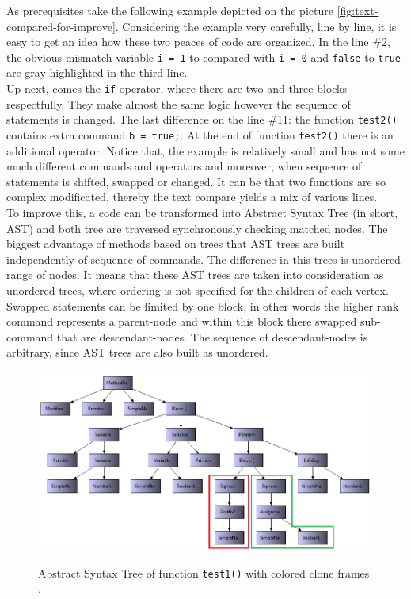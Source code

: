\documentclass{report}
\begin{document}
As prerequisites take the following example depicted on the picture \ref{fig:text-compared-for-improve}. Considering the example very carefully, line by line, it is easy to get an idea how these two peaces of code are organized. In the line \#2, the obvious mismatch variable \texttt{i = 1} to compared with \texttt{i = 0} and \texttt{false} to \texttt{true} are gray highlighted in the third line.
\\
Up next, comes the \texttt{if} operator, where there are two and three blocks respectfully. They make almost the same logic however the sequence of statements is changed.
The last difference on the line \#11: the function \texttt{test2()} contains extra command \texttt{b = true;}.
At the end of function \texttt{test2()} there is an additional operator. Notice that, the example is relatively small and has not some much different commands and operators and moreover, when sequence of statements is shifted, swapped or changed. It can be that two functions are so complex modificated, thereby the text compare yields a mix of various lines. 
\\
To improve this, a code can be transformed into Abstract Syntax Tree (in short, AST) and both tree are traversed synchronously checking matched nodes. The biggest advantage of methods based on trees that AST trees are built independently of sequence of commands. The difference in this trees is unordered range of nodes. It means that these AST trees are taken into consideration as unordered trees, where ordering is not specified for the children of each vertex. Swapped statements can be limited by one block, in other words the higher rank command represents a parent-node and within this block there swapped sub-command that are 
descendant-nodes. The sequence of descendant-nodes is arbitrary, since AST trees are also built as unordered.\\
\begin{figure}[h]
  \centering
  \includegraphics[width=1.00\textwidth]{Figures/text-to-text/graph-compared1.png}\\[0.1cm]
  \caption[Abstract Syntax Tree with colored clone frames]{Abstract Syntax Tree of function \texttt{test1()} with colored clone frames .}
  \label{fig:graph-compared1}
\end{figure}
\end{document}
